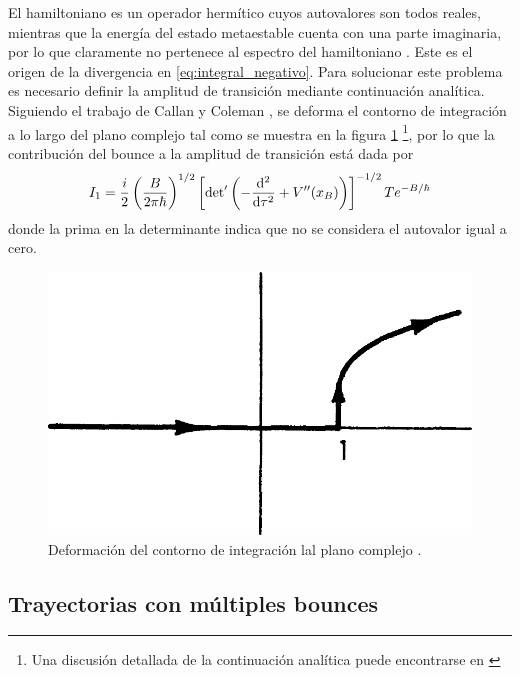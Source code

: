 El hamiltoniano es un operador hermítico cuyos autovalores son todos reales, mientras que la energía del estado metaestable cuenta con una parte imaginaria, por lo que claramente no pertenece al espectro del hamiltoniano \cite{paranjape2017theory}. Este es el origen de la divergencia en \eqref{eq:integral_negativo}. Para solucionar este problema es necesario definir la amplitud de transición mediante continuación analítica. Siguiendo el trabajo de Callan y Coleman \cite{callan1977fate}, se deforma el contorno de integración a lo largo del plano complejo tal como se muestra en la figura \ref{fig:contorno} \footnote{Una discusión detallada de la continuación analítica puede encontrarse en \cite{andreassen2017precision, paranjape2017theory}},
por lo que la contribución del bounce a la amplitud de transición está dada por
\begin{equation} \label{eq:I_bounce}
I_1 =  \frac{i}{2}  \left( \frac{B}{2\pi \hbar} \right)^{1/2}  \left[ \textrm{det}' \left(-\dv[2]{}{\tau} + V''\qty(x_B) \right)\right]^{-1/2} T e^{-B/\hbar}
\end{equation}
donde la prima en la determinante indica que no se considera el autovalor igual a cero. 
\begin{figure}[h]
	\centering
	\includegraphics[scale=0.2]{FIGURAS/contorno}
	\caption{Deformación del contorno de integración lal plano complejo \cite{callan1977fate}.}
	\label{fig:contorno}
\end{figure}

\subsection{Trayectorias con múltiples bounces}

